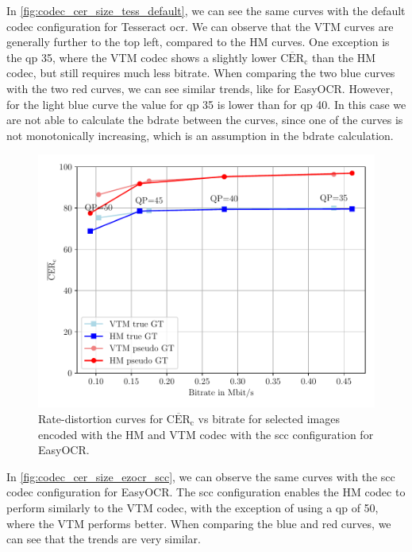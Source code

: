 In \autoref{fig:codec_cer_size_tess_default}, we can see the same curves with the default codec configuration for Tesseract \gls{ocr}.
We can observe that the VTM curves are generally further to the top left, compared to the HM curves.
One exception is the \gls{qp} 35, where the VTM codec shows a slightly lower $\overline{\text{CER}}_{\text{c}}$ than the HM codec, but still requires much less bitrate.
When comparing the two blue curves with the two red curves, we can see similar trends, like for EasyOCR.
However, for the light blue curve the value for \gls{qp} 35 is lower than for \gls{qp} 40.
In this case we are not able to calculate the \gls{bdrate} between the curves, since one of the curves is not monotonically increasing, which is an assumption in the \gls{bdrate} calculation.


\begin{figure}
    \centering
    \includegraphics[width=\textwidth]{../images/analyze/codec_cer_size_ezocr_scc.pdf}
    \caption{Rate-distortion curves for $\overline{\text{CER}}_{\text{c}}$ vs bitrate for selected images encoded with the HM and VTM codec with the \gls{scc} configuration for EasyOCR.}
    \label{fig:codec_cer_size_ezocr_scc}
\end{figure}
In \autoref{fig:codec_cer_size_ezocr_scc}, we can observe the same curves with the \gls{scc} codec configuration for EasyOCR.
The \gls{scc} configuration enables the HM codec to perform similarly to the VTM codec, with the exception of using a \gls{qp} of 50, where the VTM performs better.
When comparing the blue and red curves, we can see that the trends are very similar.
